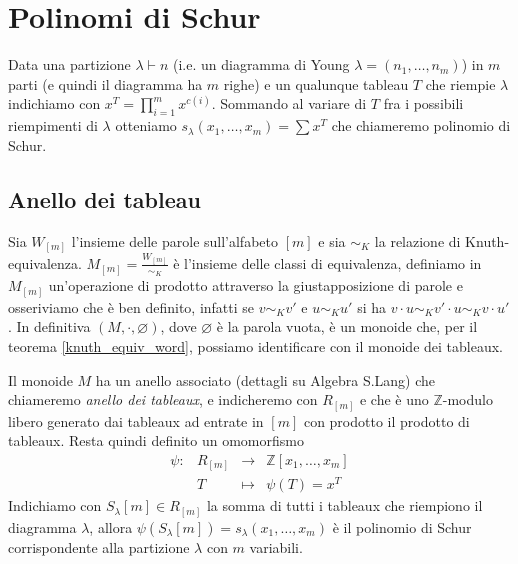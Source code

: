 \chapter{Polinomi di Schur}

\begin{defn}
Data una partizione $\lambda \vdash n$ (i.e. un diagramma di Young
$\lambda = (n_1, \ldots, n_m)$) in $m$ parti (e quindi il diagramma ha
$m$ righe) e un qualunque tableau $T$ che riempie $\lambda$ indichiamo
con $x^T = \prod\limits_{i = 1}^m x^{c(i)}$. Sommando al variare di
$T$ fra i possibili riempimenti di $\lambda$ otteniamo
\begin{math}
s_\lambda(x_1,\ldots,x_m) = \sum x^T
\end{math}
che chiameremo polinomio di Schur.
\end{defn}

\section{Anello dei tableau}

Sia $W_{[m]}$ l'insieme delle parole sull'alfabeto $[m]$ e sia
$\sim_K$ la relazione di Knuth-equivalenza. $M_{[m]} =
\frac{W_{[m]}}{\sim_K}$ \`e l'insieme delle classi di equivalenza,
definiamo in $M_{[m]}$ un'operazione di prodotto attraverso la giustapposizione di parole e
osseriviamo che \`e ben definito, infatti se $v \sim_K v'$ e $u \sim_K
u'$ si ha $v \cdot u \sim_K v' \cdot u \sim_K v \cdot u'$. In
definitiva $(M, \cdot, \varnothing)$, dove $\varnothing$ \`e la
parola vuota, \`e un monoide che, per il
teorema \eqref{knuth_equiv_word}, possiamo identificare con il monoide
dei tableaux.

Il monoide $M$ ha un anello associato (dettagli su Algebra
S.Lang) che chiameremo \emph{anello dei tableaux}, e indicheremo con
$R_{[m]}$ e che \`e uno $\mathbb{Z}$-modulo libero generato dai
tableaux ad entrate in $[m]$ con prodotto il prodotto di tableaux.
Resta quindi definito un omomorfismo
\begin{equation}
\begin{matrix}\label{ring_tab}
\psi: & R_{[m]} & \rightarrow  & \mathbb{Z}[x_1,\ldots,x_m]\\
& T      & \mapsto & \psi(T)=x^T
\end{matrix}
\end{equation}
Indichiamo con $S_\lambda[m] \in R_{[m]}$ la somma di tutti i tableaux
che riempiono il diagramma $\lambda$, allora
$\psi(S_\lambda[m])=s_\lambda(x_1,\ldots,x_m)$ \`e il polinomio di
Schur corrispondente alla partizione $\lambda$ con $m$ variabili.

